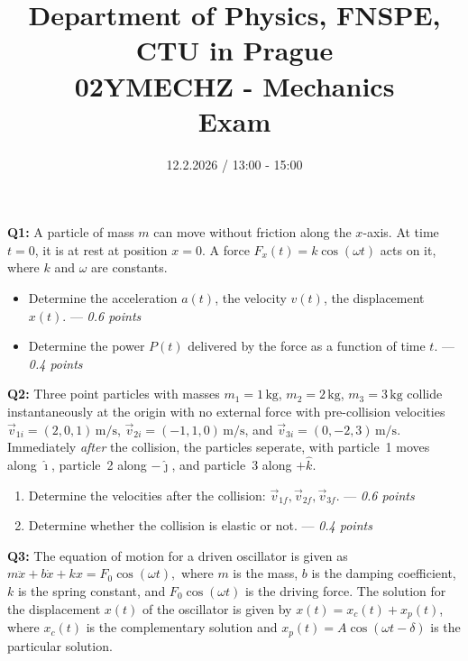 \documentclass[a4paper,12pt]{article}
\title{{\large Department of Physics, FNSPE, CTU in Prague} \\
                  02YMECHZ - Mechanics \\ 
          {\Large \textbf{Exam}}\vspace{-1cm}}
\date{12.2.2026 / 13:00 - 15:00}
\author{}
\begin{document}
\maketitle

\textbf{Q1:} A particle of mass $m$ can move without friction along the  $x$-axis. At time $t = 0$, it is at rest at position $x = 0$. A force $F_x(t) = k\cos(\omega t)$ acts on it, where $k$ and $\omega$ are constants. 
\begin{itemize}
    \item[(a)] Determine the acceleration $a(t)$, the velocity $v(t)$, the displacement $x(t)$. --- \textit{0.6 points}
    \item[(b)] Determine the power $P(t)$ delivered by the force as a function of time $t$. --- \textit{0.4 points}
\end{itemize}

\vspace*{0.1cm}
\textbf{Q2:} Three point particles with masses $m_1 = 1\,\mathrm{kg}$, $m_2 = 2\,\mathrm{kg}$, $m_3 = 3\,\mathrm{kg}$ collide instantaneously at the origin with no external force with pre-collision velocities $\vec{v}_{1i} = (2,0,1)\,\mathrm{m/s}$, $\vec{v}_{2i} = (-1,1,0)\,\mathrm{m/s}$, and
$\vec{v}_{3i} = (0,-2,3)\,\mathrm{m/s}$. Immediately \emph{after} the collision, the particles seperate, with particle~1 moves along $\hat{\imath}$, particle~2 along 
\(-\hat{\jmath}\), and particle~3 along \(+\hat{k}\).  
\begin{enumerate}
\item[(a)] Determine the velocities after the collision: 
\(\vec{v}_{1f}, \vec{v}_{2f}, \vec{v}_{3f}\). --- \textit{0.6 points}
\item[(b)] Determine whether the collision is elastic or not. --- \textit{0.4 points}
\end{enumerate}

\vspace*{0.1cm}
\textbf{Q3:} The equation of motion for a driven oscillator is given as $m \ddot{x} + b \dot{x} + k x = F_0 \cos(\omega t),$ where $m$ is the mass, $b$ is the damping coefficient, $k$ is the spring constant, and $F_0 \cos(\omega t)$ is the driving force. The solution for the displacement $x(t)$ of the oscillator is given by $x(t) = x_c(t) + x_p(t)$, where $x_c(t)$ is the complementary solution and $x_p(t) = A \cos(\omega t - \delta)$ is the particular solution. 
\end{document}
